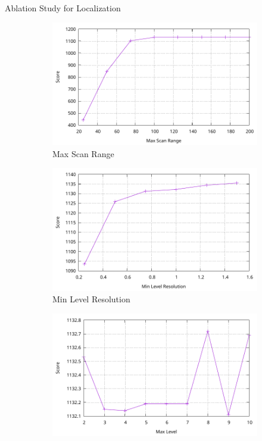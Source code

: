 \begin{frame}{Ablation Study for Localization}
\begin{figure}
    \centering
    \begin{subfigure}[t]{0.32\textwidth}
        \centering
        \includegraphics[width=\textwidth]{../02-global-localization/plots/max_scan_range.pdf}
        \caption{Max Scan Range}
    \end{subfigure}
    \begin{subfigure}[t]{0.32\textwidth}
        \centering
        \includegraphics[width=\textwidth]{../02-global-localization/plots/min_level_res.pdf}
        \caption{Min Level Resolution}
    \end{subfigure}
    \begin{subfigure}[t]{0.32\textwidth}
        \centering
        \includegraphics[width=\textwidth]{../02-global-localization/plots/max_level.pdf}

\end{subfigure}
\end{figure}
\end{frame}
